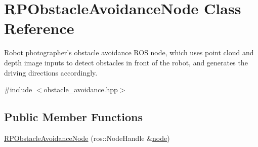 \hypertarget{class_r_p_obstacle_avoidance_node}{\section{\-R\-P\-Obstacle\-Avoidance\-Node \-Class \-Reference}
\label{class_r_p_obstacle_avoidance_node}
}


\-Robot photographer's obstacle avoidance \-R\-O\-S node, which uses point cloud and depth image inputs to detect obstacles in front of the robot, and generates the driving directions accordingly.  




{\ttfamily \#include $<$obstacle\-\_\-avoidance.\-hpp$>$}

\subsection*{\-Public \-Member \-Functions}
\begin{DoxyCompactItemize}
\item 
\hyperlink{class_r_p_obstacle_avoidance_node_a3101d307c2ed19b282ff404cbc51f477}{\-R\-P\-Obstacle\-Avoidance\-Node} (ros\-::\-Node\-Handle \&\hyperlink{class_r_p_obstacle_avoidance_node_acb163610c79438c473c4f8f8f7531ae2}{node})
\end{DoxyCompactItemize}
